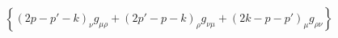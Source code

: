 \begin{equation}
\left\{(2p-p'-k)_{\nu}g_{\mu\rho}+(2p'-p-k)_{\rho}g_{\nu\mu}+(2k-p-p')_{\mu}g_{\rho\nu}\right\}
\end{equation}

